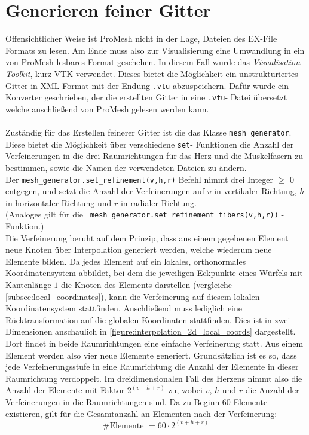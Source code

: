 \documentclass[
	a4paper,			%
	11pt,				%
	headsepline,		%
	bibtotoc,			%
	BCOR18mm,      		%
	DIV14,				%
	headings=normal,
	numbers=noenddot,
]{scrbook}
\theoremstyle{mythmstyle}
\theoremstyle{other}
\begin{document}
	\section{Generieren feiner Gitter}
	Offensichtlicher Weise ist ProMesh nicht in der Lage, Dateien des EX-File Formats zu lesen. Am Ende
	 muss also zur Visualisierung eine Umwandlung in ein von ProMesh lesbares Format geschehen. In diesem Fall
	 wurde das \emph{Visualisation Toolkit}, kurz VTK verwendet. Dieses bietet die Möglichkeit ein 
	 unstrukturiertes Gitter in XML-Format mit der Endung \verb!.vtu! abzuspeichern. Dafür wurde ein 
	 Konverter geschrieben, der die erstellten Gitter in eine \verb!.vtu!- Datei übersetzt welche anschließend
	 von ProMesh gelesen werden kann.\\\\
	 Zuständig für das Erstellen feinerer Gitter ist die das Klasse \verb!mesh_generator!. Diese bietet die 
	 Möglichkeit über verschiedene \verb!set!- Funktionen die Anzahl der Verfeinerungen in die drei Raumrichtungen
	 für das Herz und die Muskelfasern zu bestimmen, sowie die Namen der verwendeten Dateien zu ändern.
	  \\Der \verb!mesh_generator.set_refinement(v,h,r)! Befehl
	 nimmt drei Integer $\geq$ 0 entgegen, und setzt die Anzahl der Verfeinerungen auf $v$ in vertikaler Richtung,
	  $h$ in
	 horizontaler Richtung und $r$ in radialer Richtung. \\(Analoges gilt für die 
	 \verb! mesh_generator.set_refinement_fibers(v,h,r))! -Funktion.)\\
	 Die Verfeinerung beruht auf dem Prinzip, dass aus einem gegebenen Element neue Knoten über Interpolation
	 generiert werden, welche wiederum neue Elemente bilden. Da jedes Element auf ein lokales, orthonormales
	 Koordinatensystem abbildet, bei dem die jeweiligen Eckpunkte eines Würfels mit Kantenlänge $1$ die Knoten
	 des Elements darstellen (vergleiche \autoref{subsec:local_coordinates}), kann die Verfeinerung auf
	 diesem lokalen Koordinatensystem stattfinden. Anschließend muss lediglich eine Rücktransformation auf die
	 globalen Koordinaten stattfinden. Dies ist in zwei Dimensionen anschaulich in
	 \autoref{figure:interpolation_2d_local_coords} dargestellt. Dort findet in beide Raumrichtungen eine
	 einfache Verfeinerung statt.  Aus einem Element werden also vier neue Elemente generiert. Grundsätzlich ist
	 es so, dass jede Verfeinerungsstufe in eine Raumrichtung die Anzahl der Elemente in dieser Raumrichtung 
	 verdoppelt. Im dreidimensionalen Fall des Herzens nimmt also die Anzahl der Elemente mit Faktor
	 $2^{(v + h + r)}$ zu, wobei $v$, $h$ und $r$ die Anzahl der Verfeinerungen in die Raumrichtungen sind.
	 Da zu Beginn 60 Elemente existieren, gilt für die Gesamtanzahl an Elementen nach der Verfeinerung:\[
	 	\#\text{Elemente }= 60\cdot 2^{(v + h + r)}\]
	 \clearpage
	 
\end{document}
